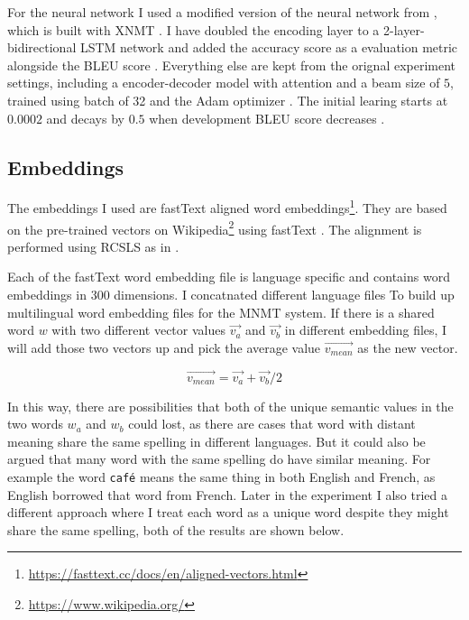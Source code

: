 \documentclass[thesis,fonts=libertine]{cluu}
\begin{document}
For the neural network I used a modified version of the neural network from \cite{Qi:2018aa}, which is built with XNMT \cite{Neubig:2018aa}. I have doubled the encoding layer to a 2-layer-bidirectional LSTM network and added the accuracy score as a evaluation metric alongside the BLEU score \parencite{papineni-etal-2002-bleu}. Everything else are kept from the orignal experiment settings, including a encoder-decoder model with attention \parencite{Bahdanau:2014aa} and a beam size of $5$, trained using batch of 32 and the Adam optimizer \parencite{Kingma:2014aa}. The initial learing starts at $0.0002$ and decays by $0.5$ when development BLEU score decreases \parencite{Denkowski:2017aa}.

\subsection{Embeddings}

The embeddings I used are fastText aligned word embeddings\footnote{\url{https://fasttext.cc/docs/en/aligned-vectors.html}}. They are based on the pre-trained vectors on Wikipedia\footnote{\url{https://www.wikipedia.org/}} using fastText \parencite{Bojanowski:2016aa}. The alignment is performed using RCSLS as in \cite{Joulin:2018aa}.

Each of the fastText word embedding file is language specific and contains word embeddings in 300 dimensions. I concatnated different language files To build up multilingual word embedding files for the MNMT system. If there is a shared word $w$ with two different vector values $\vec{v_a}$ and $\vec{v_b}$ in different embedding files, I will add those two vectors up and pick the average value $\vec{v_{mean}}$ as the new vector.

\begin{equation}
  \vec{v_{mean}} = \vec{v_a} + \vec{v_b} / 2
\end{equation}

In this way, there are possibilities that both of the unique semantic values in the two words $w_a$ and $w_b$ could lost, as there are cases that word with distant meaning share the same spelling in different languages. But it could also be argued that many word with the same spelling do have similar meaning. For example the word \verb|café| means the same thing in both English and French, as English borrowed that word from French. Later in the experiment I also tried a different approach where I treat each word as a unique word despite they might share the same spelling, both of the results are shown below.
\end{document}
